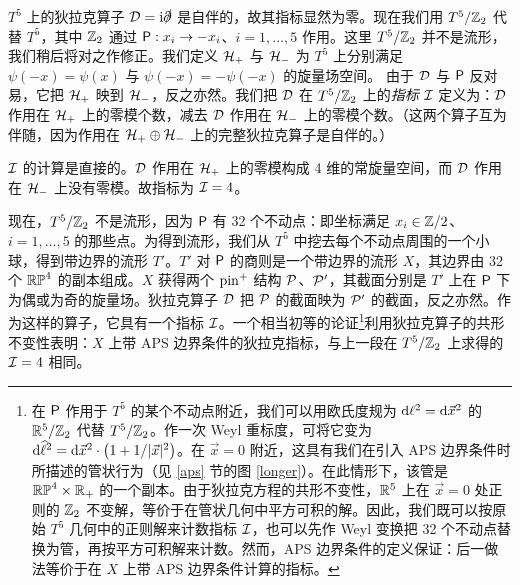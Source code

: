 $T^5$ 上的狄拉克算子 $\D=\i \slashed{\partial}$ 是自伴的，故其指标显然为零。现在我们用 $T^5/\Z_2$ 代替 $T^5$，其中 $\Z_2$ 通过 $\sP:x_i\to -x_i$、$i=1,\dots,5$ 作用。这里 $T^5/\Z_2$ 并不是流形，我们稍后将对之作修正。我们定义 $\H_+$ 与 $\H_-$ 为 $T^5$ 上分别满足 $\psi(-x)=\psi(x) $ 与 $\psi(-x)=-\psi(-x)$ 的旋量场空间。
由于 $\D$ 与 $\sP$ 反对易，它把 $\H_+$ 映到 $\H_-$，反之亦然。我们把 $\D$ 在 $T^5/\Z_2$ 上的\emph{指标} $\I$ 定义为：$\D$ 作用在 $\H_+$ 上的零模个数，减去 $\D$ 作用在 $\H_-$ 上的零模个数。（这两个算子互为伴随，因为作用在 $\H_+\oplus \H_-$ 上的完整狄拉克算子是自伴的。）

$\I$ 的计算是直接的。$\D$ 作用在 $\H_+$ 上的零模构成 4 维的常旋量空间，而 $\D$ 作用在 $\H_-$ 上没有零模。故指标为 $\I=4$。

现在，$T^5/\Z_2$ 不是流形，因为 $\sP$ 有 32 个不动点：即坐标满足 $x_i\in \Z/2$、$i=1,\dots,5$ 的那些点。为得到流形，我们从 $T^5$ 中挖去每个不动点周围的一个小球，得到带边界的流形 $T'$。$T'$ 对 $\sP$ 的商则是一个带边界的流形 $X$，其边界由 32 个 $\RP^4$ 的副本组成。$X$ 获得两个 $\pin^+$ 结构 $\P$、$\P'$，其截面分别是 $T'$ 上在 $\sP$ 下为偶或为奇的旋量场。狄拉克算子 $\D$ 把 $\P$ 的截面映为 $\P'$ 的截面，反之亦然。作为这样的算子，它具有一个指标 $\I$。一个相当初等的论证\footnote{在 $\sP$ 作用于 $T^5$ 的某个不动点附近，我们可以用欧氏度规为 $\d \ell^2=\d \vec x^2$ 的 $\R^5/\Z_2$ 代替 $T^5/\Z_2$。作一次 Weyl 重标度，可将它变为 $\d\h\ell^2=\d \vec x^2\cdot \left(1+{1}/{|\vec x|^2}\right)$。在 $\vec x=0$ 附近，这具有我们在引入 APS 边界条件时所描述的管状行为（见 \ref{aps} 节的图 \ref{longer}）。在此情形下，该管是 $\RP^4\times \R_+$ 的一个副本。由于狄拉克方程的共形不变性，$\R^5$ 上在 $\vec x=0$ 处正则的 $\Z_2$ 不变解，等价于在管状几何中平方可积的解。因此，我们既可以按原始 $T^5$ 几何中的正则解来计数指标 $\I$，也可以先作 Weyl 变换把 32 个不动点替换为管，再按平方可积解来计数。然而，APS 边界条件的定义保证：后一做法等价于在 $X $ 上带 APS 边界条件计算的指标。}利用狄拉克算子的共形不变性表明：$X$ 上带 APS 边界条件的狄拉克指标，与上一段在 $T^5/\Z_2$ 上求得的 $\I=4$ 相同。

